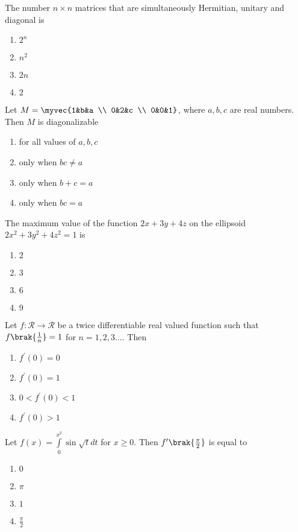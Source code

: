     \item The number $n\times n$ matrices that are simultaneously Hermitian, unitary and diagonal is
        \begin{enumerate}
            \item $2^n$
            \item $n^2$
            \item $2n$
            \item $2$
        \end{enumerate}

    \item Let $M=\myvec{1&b&a \\ 0&2&c \\ 0&0&1}$, where $a,b,c$ are real numbers. Then $M$ is diagonalizable
        \begin{enumerate}
            \item for all values of $a,b,c$
            \item only when $bc\neq a$
            \item only when $b+c=a$
            \item only when $bc=a$
        \end{enumerate}

    \item The maximum value of the function $2x+3y+4z$ on the ellipsoid $2x^2+3y^2+4z^2=1$ is
        \begin{enumerate}
            \item $2$
            \item $3$
            \item $6$
            \item $9$
        \end{enumerate}

    \item Let $f:\mathcal{R}\to\mathcal{R}$ be a twice differentiable real valued function such that $f\brak{\frac{1}{n}}=1$ for $n=1,2,3\dots$. Then
        \begin{enumerate}
            \item $f^\prime(0)=0$
            \item $f^\prime(0)=1$
            \item $0<f^\prime(0)<1$
            \item $f^\prime(0)>1$
        \end{enumerate}

    \item Let $f(x)=\int\limits_0^{x^2}\sin\sqrt{t}dt$ for $x\geq0$. Then $f^\prime\brak{\frac{\pi}{2}}$ is equal to
        \begin{enumerate}
            \item $0$
            \item $\pi$
            \item $1$
            \item $\frac{\pi}{2}$
        \end{enumerate}


